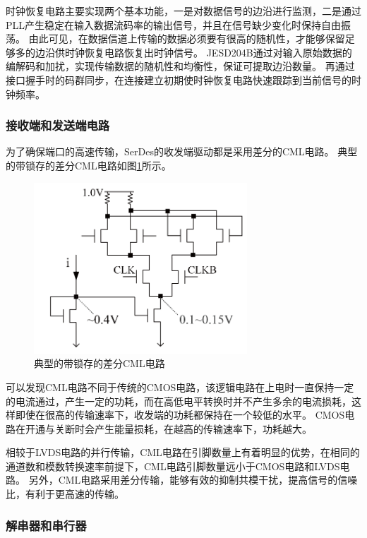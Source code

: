 \documentclass[UTF8]{ctexart}
\begin{document}
时钟恢复电路主要实现两个基本功能，一是对数据信号的边沿进行监测，二是通过PLL产生稳定在输入数据流码率的输出信号，并且在信号缺少变化时保持自由振荡。
由此可见，在数据信道上传输的数据必须要有很高的随机性，才能够保留足够多的边沿供时钟恢复电路恢复出时钟信号。
JESD204B通过对输入原始数据的编解码和加扰，实现传输数据的随机性和均衡性，保证可提取边沿数量。
再通过接口握手时的码群同步，在连接建立初期使时钟恢复电路快速跟踪到当前信号的时钟频率。

\subsubsection{接收端和发送端电路}

为了确保端口的高速传输，SerDes的收发端驱动都是采用差分的CML电路。
典型的带锁存的差分CML电路如图\ref{fig:standard_CML_latch_with_poor_mirror_accuracy}所示。

\begin{figure}[H]
\centering
\includegraphics[width=8cm]{./img/standard_CML_latch_with_poor_mirror_accuracy.png}
\caption{典型的带锁存的差分CML电路}
\label{fig:standard_CML_latch_with_poor_mirror_accuracy}
\end{figure}

可以发现CML电路不同于传统的CMOS电路，该逻辑电路在上电时一直保持一定的电流通过，产生一定的功耗，而在高低电平转换时并不产生多余的电流损耗，这样即使在很高的传输速率下，收发端的功耗都保持在一个较低的水平。
CMOS电路在开通与关断时会产生能量损耗，在越高的传输速率下，功耗越大。

相较于LVDS电路的并行传输，CML电路在引脚数量上有着明显的优势，在相同的通道数和模数转换速率前提下，CML电路引脚数量远小于CMOS电路和LVDS电路\cite{Harris2013}。
另外，CML电路采用差分传输，能够有效的抑制共模干扰，提高信号的信噪比，有利于更高速的传输。

\subsubsection{解串器和串行器}
\end{document}
